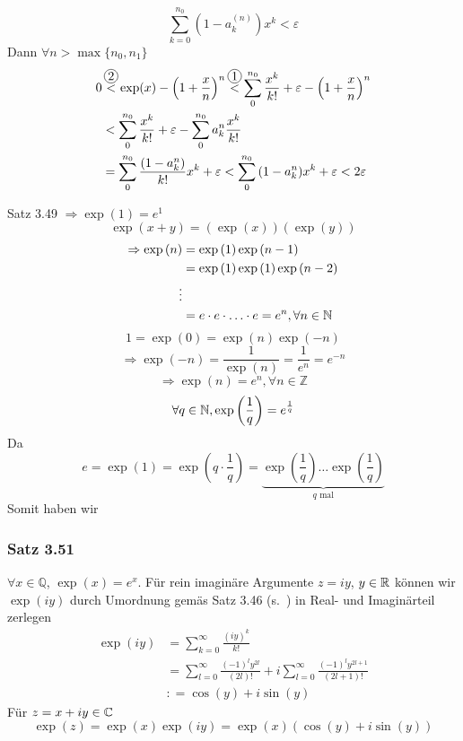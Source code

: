\[\sum\limits_{k = 0}^{{n_0}} {\left( {1 - a_k^{(n)}} \right){x^k}}  < \varepsilon \]
Dann $\forall n>\max\{ n_0,n_1\}$
\begin{align*}
0&\mathop  < \limits^{\mycirc{2}} \exp (x) - {\left( {1 + \frac{x}{n}} \right)^n}\mathop  < \limits^{\mycirc{1}} \sum\limits_0^{{n_0}} {\frac{{{x^k}}}{{k!}}}  + \varepsilon  - {\left( {1 + \frac{x}{n}} \right)^n}\\
 &< \sum\limits_0^{{n_0}} {\frac{{{x^k}}}{{k!}}}  + \varepsilon  - \sum\limits_0^{{n_0}} {a_k^n} \frac{{{x^k}}}{{k!}}\\
 &= \sum\limits_0^{{n_0}} {\frac{{(1 - a_k^n)}}{{k!}}} {x^k} + \varepsilon  < \sum\limits_0^{{n_0}} {\left( {1 - a_k^n} \right)} {x^k} + \varepsilon  < 2\varepsilon
\end{align*}

\noindent Satz 3.49 $\Rightarrow \exp(1)=e^1$
\[\exp \left( {x + y} \right) =\left( {\exp \left( x \right)} \right)\left( {\exp \left( y \right)} \right)\]
\begin{align*}
 \Rightarrow \exp \left( n \right) &=\exp \left( 1 \right)\exp \left( {n - 1} \right)\\
 &=\exp \left( 1 \right)\exp \left( 1 \right)\exp \left( {n - 2} \right)\\
 \vdots \\
 &=e \cdot e \cdot  \ldots  \cdot e = {e^n}, \forall n\in\mathbb{N}
\end{align*}
\[1=\exp(0)=\exp(n)\exp(-n)\]
\[\Rightarrow\exp(-n)=\frac{1}{\exp(n)}=\frac{1}{e^n}=e^{-n}\]
\[\Rightarrow \exp(n)=e^n, \forall n\in\mathbb{Z}\]
\[\forall q\in\mathbb{N}, \exp\left(\frac{1}{q}\right)=e^{\frac{1}{q}}\]
Da
\[ e=\exp(1)=\exp\left(q\cdot\frac{1}{q}\right)=\underbrace {\exp \left( {\frac{1}{q}} \right) \ldots \exp \left( {\frac{1}{q}} \right)}_{q{\text{ mal}}}\]
Somit haben wir
\subsubsection*{Satz 3.51}
$\forall x\in\mathbb{Q}$, $\exp(x)=e^x$. Für rein imaginäre Argumente $z=iy$, $y\in\mathbb{R}$ können wir $\exp(iy)$ durch Umordnung gemäs Satz 3.46 (s.~\pageref{satz3.46}) in Real- und Imaginärteil zerlegen
\begin{align*}
\exp \left( {iy} \right)&= \sum\limits_{k = 0}^\infty  {\frac{{{{\left( {iy} \right)}^k}}}{{k!}}} \\
&= \sum\limits_{l = 0}^\infty  {\frac{{{{\left( { - 1} \right)}^l}{y^{2l}}}}{{\left( {2l} \right)!}}}  + i\sum\limits_{l = 0}^\infty  {\frac{{{{\left( { - 1} \right)}^l}{y^{2l + 1}}}}{{\left( {2l + 1} \right)!}}} \\
&: = \cos \left( y \right) + i\sin \left( y \right)
\end{align*}
Für $z=x+iy\in\mathbb{C}$
\[\exp \left( z \right) = \exp \left( x \right)\exp \left( {iy} \right) = \exp \left( x \right)\left( {\cos \left( y \right) + i\sin \left( y \right)} \right)\]

